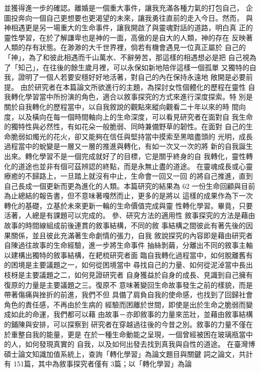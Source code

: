 並獲得進一步的確認。離婚是一個重大事件，讓我充滿各種力氣的打包自己，
企圖投奔向一個自己更想要也更渴望的未來，讓我勇往直前的走入今日。然而，
與神相遇更是另一場重大的生命事件，讓我開啟了與靈魂對話的道路，明白真
正的靈性學習，在於了解謙卑也是神的一面，高傲的是自大的人類，神的存在
反映著人類的存有狀態。在渺渺的大千世界裡，倘若有機會遇見一位真正屬於
自己的「神」，為了和彼此相遇而千山萬水、不辭勞苦，那這樣的相遇想必是把
自己視為了「知己」，在往後的餘生歲月裡，可以永保如新地陪伴這樣一個孤單
又獨特的自我，證明了一個人若要安穩好好地活著，對自己的內在保持永遠地
敞開是必要前提。 
由於研究者在本篇論文所欲進行的主題，為探討女性個體化的歷程在靈性
自我轉化學習當中所扮演的角色，適合以敘事探究的方式來進行深度探索。特
別是關於自我轉化的歷程當中，以自我敘說的觀點來縱向觀看二十年以來的時
間向度，以及橫向在每一個時間軸向上的生命深度，可以看見研究者在面對自
我生命的獨特性與必然性，有如花朵一般脆弱、同時兼備野草的韌性。在面對
自己的生命脆弱如燭光的花火，卻又能夠在信任與堅持當中摸索至黑暗盡頭的
光明，成長過程當中的蛻變是一層又一層的推進與轉化，有如一次又一次的將
新的自我誕生出來。轉化學習不是一個完成就好了的目標，它是關乎終身的自
我轉化，靈性轉化的道途也並非有個可茲辨認的終點，而是永無止盡的道途。
在靈魂成長或心靈療癒的不歸路上，一旦踏上就沒有中止，生命會一回又一回
的將自己推進，直到自己長成一個更新而更為進化的人類。本篇研究的結果為
62 
一份生命回顧與目前為止總結的報告書，但不意味著嘎然而止，更多的是將以
這樣的成果作為下一次轉化的基礎，立基於未來更新一輪的生命價值完成與靈
性轉化學習。畢竟，只要活著，人總是有課題可以完成的。 
參、研究方法的適用性 
敘事探究的方法是藉由故事的時間線組成前後連貫的敘事結構，不同的敘
事結構之間彼此有著先後的因果關係，並且彼此充滿著生命劇情的張力，自我
敘說探究的內容即是藉由研究者自陳過往故事的生命經驗，進一步將生命事件
抽絲剝繭，分離出不同的敘事主軸以建構出獨特的敘事結構，在耙梳研究者面
臨自我轉化過程當中，如何脫離舊有的困境是主要議題之一，如何從困境當中
尋找自己的力量、如何從泥淖當中長出枝枒是主要議題之二，如何見證研究者
自身獲益於自身的成長、見識到自己擁有復原的力量是主要議題之三。復原不
意味著變回生命故事發生之前的樣貌，而是帶著傷痛與挫折的前進，我們不但
具備了肩負自我的使命感，也找到了回歸社會角色的責任感，不再由於生病的
經驗而困離於世間，即使是出於生命之脆弱而變成如此的命運，我們都可以藉
由故事－亦即敘事的力量來茁壯，並藉由敘事結構的鋪陳與安排，可以探察到
研究者在穿越過往後的今昔之別。敘事的力量不僅在於重整自我的能量，更是
在於一種生命動能之呈現，一個曾經被困在玻璃瓶當中的人，如何發現真實的
自我，以及如何出發去找到真我與自性的道途。 
在臺灣博碩士論文知識加值系統上，查詢「轉化學習」為論文題目與關鍵
詞之論文，共計有 151篇，其中為敘事探究者僅有 3篇；以「轉化學習」為論
